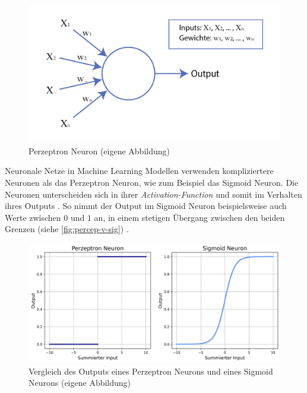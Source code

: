 \begin{figure}[!ht]
   \centering
   \includegraphics[width=\textwidth]{images/theorie/neuron.png}
   \caption{Perzeptron Neuron (eigene Abbildung)}\label{fig:neuron}
\end{figure}
 
Neuronale Netze in Machine Learning Modellen verwenden kompliziertere Neuronen
als das Perzeptron Neuron, wie zum Beispiel das Sigmoid Neuron. Die Neuronen
unterscheiden sich in ihrer \emph{Activation-Function} und somit im Verhalten ihres
Outputs \cite{pragati_baheti_activation_2022}. So nimmt der Output im Sigmoid Neuron
beispielsweise auch Werte zwischen $0$ und $1$ an, in einem stetigen Übergang
zwischen den beiden Grenzen (siehe \autoref{fig:percep-v-sig}) \cite{kumar_sigmoid_2019}.
 
\begin{figure}[!ht]
   \centering
   \includegraphics[width=\textwidth]{images/theorie/percep-v-sig.png}
   \caption{Vergleich des Outputs eines Perzeptron Neurons und eines Sigmoid Neurons (eigene Abbildung)}\label{fig:percep-v-sig}
\end{figure}
 
